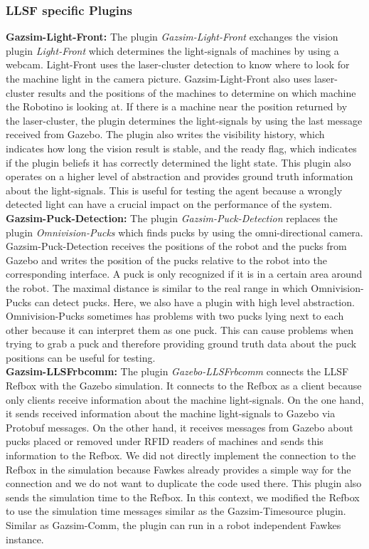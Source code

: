 \subsubsection{LLSF specific Plugins}
\textbf{Gazsim-Light-Front:}
The plugin \textit{Gazsim-Light-Front} exchanges the vision plugin \textit{Light-Front} which determines the light-signals of machines by using a webcam. Light-Front uses the laser-cluster detection to know where to look for the machine light in the camera picture. Gazsim-Light-Front also uses laser-cluster results and the positions of the machines to determine on which machine the Robotino is looking at. If there is a machine near the position returned by the laser-cluster, the plugin determines the light-signals by using the last message received from Gazebo. The plugin also writes the visibility history, which indicates how long the vision result is stable, and the ready flag, which indicates if the plugin beliefs it has correctly determined the light state. This plugin also operates on a higher level of abstraction and provides ground truth information about the light-signals. This is useful for testing the agent because a wrongly detected light can have a crucial impact on the performance of the system.
\\
\textbf{Gazsim-Puck-Detection:}
The plugin \textit{Gazsim-Puck-Detection} replaces the plugin \textit{Omnivision-Pucks} which finds pucks by using the omni-directional camera. Gazsim-Puck-Detection receives the positions of the robot and the pucks from Gazebo and writes the position of the pucks relative to the robot into the corresponding interface. A puck is only recognized if it is in a certain area around the robot. The maximal distance is similar to the real range in which Omnivision-Pucks can detect pucks. Here, we also have a plugin with high level abstraction. Omnivision-Pucks sometimes has problems with two pucks lying next to each other because it can interpret them as one puck. This can cause problems when trying to grab a puck and therefore providing ground truth data about the puck positions can be useful for testing.
\\
\textbf{Gazsim-LLSFrbcomm:}
The plugin \textit{Gazebo-LLSFrbcomm} connects the LLSF Refbox with the Gazebo simulation. It connects to the Refbox as a client because only clients receive information about the machine light-signals. On the one hand, it sends received information about the machine light-signals to Gazebo via Protobuf messages. On the other hand, it receives messages from Gazebo about pucks placed or removed under RFID readers of machines and sends this information to the Refbox. We did not directly implement the connection to the Refbox in the simulation because Fawkes already provides a simple way for the connection and we do not want to duplicate the code used there. This plugin also sends the simulation time to the Refbox. In this context, we modified the Refbox to use the simulation time messages similar as the Gazsim-Timesource plugin. Similar as Gazsim-Comm, the plugin can run in a robot independent Fawkes instance.
